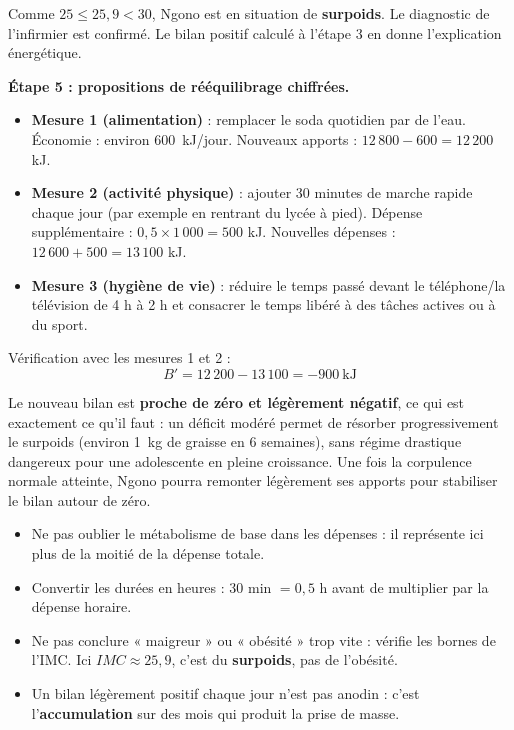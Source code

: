 \documentclass[11pt]{article}
\newcommand{\cle}[1]{{\popxbold\color{popdark}#1}}
\begin{document}
\begin{exoresolu}
Comme $25 \leq 25{,}9 < 30$, Ngono est en situation de \textbf{surpoids}. Le diagnostic de l'infirmier est confirmé. Le bilan positif calculé à l'étape 3 en donne l'explication énergétique.

\textbf{Étape 5 : propositions de rééquilibrage chiffrées.}

\begin{itemize}
\item \textbf{Mesure 1 (alimentation)} : remplacer le soda quotidien par de l'eau. Économie : environ \SI{600}{kJ/jour}. Nouveaux apports : $12\,800 - 600 = 12\,200$ kJ.
\item \textbf{Mesure 2 (activité physique)} : ajouter 30 minutes de marche rapide chaque jour (par exemple en rentrant du lycée à pied). Dépense supplémentaire : $0{,}5 \times 1\,000 = 500$ kJ. Nouvelles dépenses : $12\,600 + 500 = 13\,100$ kJ.
\item \textbf{Mesure 3 (hygiène de vie)} : réduire le temps passé devant le téléphone/la télévision de 4 h à 2 h et consacrer le temps libéré à des tâches actives ou à du sport.
\end{itemize}

Vérification avec les mesures 1 et 2 :
\[ B' = 12\,200 - 13\,100 = -900 \ \text{kJ} \]

Le nouveau bilan est \textbf{proche de zéro et légèrement négatif}, ce qui est exactement ce qu'il faut : un déficit modéré permet de résorber progressivement le surpoids (environ \SI{1}{kg} de graisse en 6 semaines), sans régime drastique dangereux pour une adolescente en pleine croissance. Une fois la corpulence normale atteinte, Ngono pourra remonter légèrement ses apports pour stabiliser le bilan autour de zéro.
\end{exoresolu}

\begin{attention}
\begin{itemize}
\item Ne pas oublier le \cle{métabolisme de base} dans les dépenses : il représente ici plus de la moitié de la dépense totale.
\item Convertir les durées en heures : 30 min $= 0{,}5$ h avant de multiplier par la dépense horaire.
\item Ne pas conclure « maigreur » ou « obésité » trop vite : vérifie les bornes de l'IMC. Ici $IMC \approx 25{,}9$, c'est du \textbf{surpoids}, pas de l'obésité.
\item Un bilan légèrement positif chaque jour n'est pas anodin : c'est l'\textbf{accumulation} sur des mois qui produit la prise de masse.
\end{itemize}
\end{attention}
\end{document}
